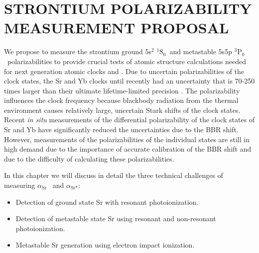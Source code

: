 \chapter{STRONTIUM POLARIZABILITY MEASUREMENT PROPOSAL}
\label{alphaSrChapter}


\newcommand*{\sSz}{$^1\textrm{S}_0$~}
\newcommand*{\tPz}{$^3\textrm{P}_0$~}
\newcommand*{\tPo}{$^3\textrm{P}_1$~}
\newcommand*{\tPt}{$^3\textrm{P}_2$~}
\newcommand*{\sDt}{$^1\textrm{D}_2$~}
\newcommand*{\tDo}{$^3\textrm{D}_1$~}
\newcommand*{\sPo}{$^1\textrm{P}_1$~}
\newcommand*{\tSo}{$^3\textrm{S}_1$~}
\newcommand*{\muW}{$\mu\textrm{W}$~}

\newcommand*{\aSr}{$\alpha_\textrm{Sr}$}
\newcommand*{\aSrm}{$\alpha_\textrm{Sr*}$}


We propose to measure the strontium ground 5s$^2$ \sSz and metastable 5s5p \tPz polarizabilities to provide crucial tests of atomic structure calculations needed for next generation atomic clocks \cite{Mit10} and \cite{Lud08}. Due to uncertain polarizabilities of the clock states, the Sr and Yb clocks until recently had an uncertainty that is 70-250 times larger than their ultimate lifetime-limited precision \cite{Lud08, Lem09}. The polarizability influences the clock frequency because blackbody radiation from the thermal environment causes relatively large, uncertain Stark shifts of the clock states. Recent \emph{in situ} measurements of the differential polarizability of the clock states of Sr \cite{Mid12a} and Yb \cite{She12} have significantly reduced the uncertainties due to the BBR shift. However, measurements of the polarizabilities of the individual states are still in high demand due to the importance of accurate calibration of the BBR shift and due to the difficulty of calculating these polarizabilities.

In this chapter we will discuss in detail the three technical challenges of measuring \aSr~ and \aSrm:
\begin{itemize}
\item Detection of ground state Sr with resonant photoionization. 
\item Detection of metastable state Sr using resonant and non-resonant photoionization.
\item Metastable Sr generation using electron impact ionization.
\end{itemize}




